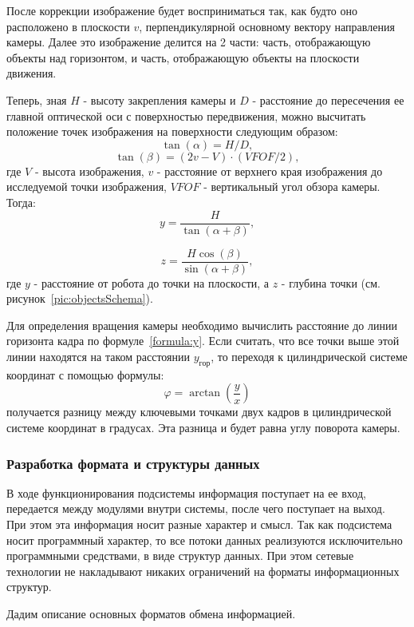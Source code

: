 После коррекции изображение будет восприниматься так, как будто оно расположено в плоскости $v$, перпендикулярной основному вектору направления камеры.  Далее это изображение делится на 2 части: часть, отображающую объекты над горизонтом, и часть, отображающую объекты на плоскости движения. 

Теперь, зная $H$ - высоту закрепления камеры и $D$ - расстояние до пересечения ее главной оптической оси с поверхностью передвижения, можно высчитать положение точек изображения на поверхности следующим образом:
$$
\tan(\alpha ) = H/D,
$$
$$
\tan(\beta ) = (2 v - V) \cdot (VFOF / 2),
$$
где $V$ - высота изображения, $v$ - расстояние от верхнего края изображения до исследуемой точки изображения, $VFOF$ - вертикальный угол обзора камеры. Тогда:
\begin{equation}\label{formula:y}
y = \frac{H}{\tan (\alpha + \beta) },
\end{equation}

$$
z = \frac{H \cos(\beta)}{\sin (\alpha + \beta)},
$$
где $y$ - расстояние от робота до точки на плоскости, а $z$ - глубина точки (см. рисунок~\ref{pic:objectsSchema}).

Для определения вращения камеры необходимо вычислить расстояние до линии горизонта кадра по формуле~\ref{formula:y}. Если считать, что все точки выше этой линии находятся на таком расстоянии $y_{гор}$, то переходя к цилиндрической системе координат с помощью формулы:
$$
	\varphi = \arctan (\frac{y}{x})
$$
получается разницу между ключевыми точками двух кадров в цилиндрической системе координат в градусах. Эта разница и будет равна углу поворота камеры. 

\subsubsection{Разработка формата и структуры данных}
В ходе функционирования подсистемы информация поступает на ее вход, передается между модулями внутри системы, после чего поступает на выход. При этом эта информация носит разные характер и смысл. Так как подсистема носит программный характер, то все потоки данных реализуются исключительно программными средствами, в виде структур данных. При этом сетевые технологии не накладывают никаких ограничений на форматы информационных структур.

Дадим описание основных форматов обмена информацией.


